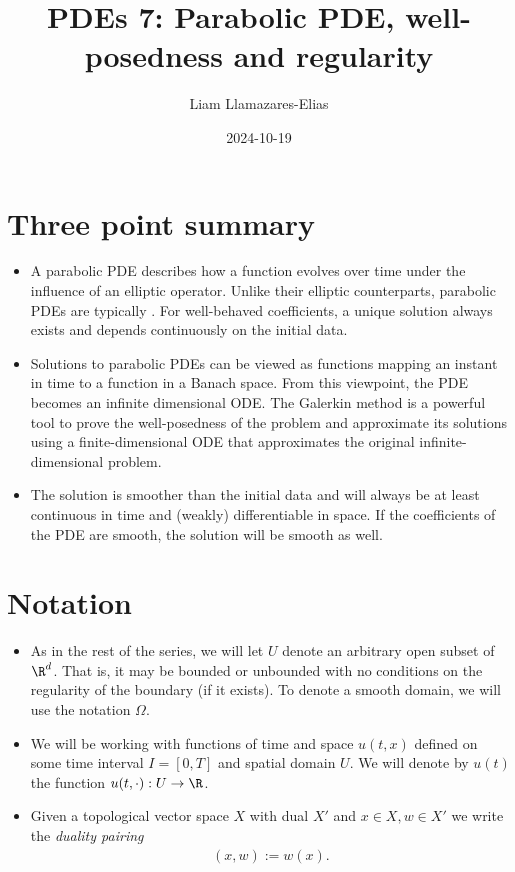 \documentclass[
    a4paper,
    DIV=14,
    abstract=true,
    numbers=noenddot
]{scrartcl}
\begin{document}
\title{PDEs 7: Parabolic PDE, well-posedness and regularity}
\author{Liam Llamazares-Elias}
\date{2024-10-19}
\maketitle
\section{Three point summary}
\begin{itemize}
  \item A parabolic PDE describes how a function evolves over time under the influence of an elliptic operator. Unlike their elliptic counterparts, parabolic PDEs are typically . For well-behaved coefficients, a unique solution always exists and depends continuously on the initial data.
  \item Solutions to parabolic PDEs can be viewed as functions mapping an instant in time to a function in a Banach space. From this viewpoint, the PDE becomes an infinite dimensional ODE. The Galerkin method is a powerful tool to prove the well-posedness of the problem and approximate its solutions using a finite-dimensional ODE that approximates the original infinite-dimensional problem.
  \item The solution is smoother than the initial data and will always be at least continuous in time and (weakly) differentiable in space. If the coefficients of the PDE are smooth, the solution will be smooth as well.
\end{itemize}
\section{Notation}
\begin{itemize}
  \item As in the rest of the series, we will let $U$ denote an arbitrary open subset of $\R^d$. That is, it may be bounded or unbounded with no conditions on the regularity of the boundary (if it exists). To denote a smooth domain, we will use the notation $\Omega $.
  \item We will be working with functions of time and space $u(t,x)$ defined on some time interval $I=[0, T]$ and spatial domain $U$. We will denote by $u(t)$ the function $u(t,\cdot):U\to \R$.
  \item Given a topological vector space $X$ with dual $X'$ and $x \in X, w \in X'$ we write the \emph{duality pairing}
     \begin{align*}
 (x,w):= w(x).
     \end{align*}

\end{itemize}
\end{document}
